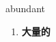 
\begin{frame}
{\huge abundant}
\begin{center}
\begin{enumerate}\Large
  \item \textbf{大量的}
\end{enumerate}
\end{center}
\end{frame}
